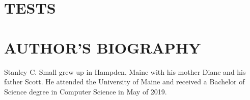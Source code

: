 \documentclass{article}
\begin{document}
\newpage
\appendix
\section{\MakeUppercase{Tests}}
\begin{singlespace}
\end{singlespace}


\newpage
{}
\vspace*{.05in}
\section*{\MakeUppercase{Author's Biography}}
Stanley C. Small grew up in Hampden, Maine with his mother Diane and his father Scott. He attended the University of Maine and received a Bachelor of Science degree in Computer Science in May of 2019. 
\end{document}
